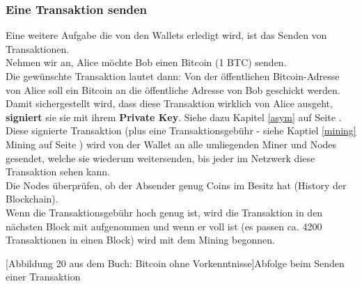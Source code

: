\documentclass[10pt,a4paper,titlepage]{paper}
\begin{document}
\subsubsection{Eine Transaktion senden}
Eine weitere Aufgabe die von den Wallets erledigt wird, ist das Senden von Transaktionen.\\
Nehmen wir an, Alice möchte Bob einen Bitcoin (1 BTC) senden.\\
Die gewünschte Transaktion lautet dann: Von der öffentlichen Bitcoin-Adresse von Alice soll ein Bitcoin an die öffentliche Adresse von Bob geschickt werden.\\
Damit sichergestellt wird, dass diese Transaktion wirklich von Alice ausgeht, \textbf{signiert} sie sie mit ihrem \textbf{Private Key}. Siehe dazu Kapitel \ref{asym} auf Seite \pageref{asym}.\\
Diese signierte Transaktion (plus eine Transaktionsgebühr - siehe Kaptiel \ref{mining} Mining auf Seite \pageref{mining}) wird von der Wallet an alle umliegenden Miner und Nodes gesendet, welche sie wiederum weitersenden, bis jeder im Netzwerk diese Transaktion sehen kann.\\
Die Nodes überprüfen, ob der Absender genug Coins im Besitz hat (History der Blockchain).\\
Wenn die Transaktionsgebühr hoch genug ist, wird die Transaktion in den nächsten Block mit aufgenommen und wenn er voll ist (es passen ca. 4200 Transaktionen in einen Block) wird mit dem Mining begonnen.
\begin{center}
[Abbildung 20 aus dem Buch: Bitcoin ohne Vorkenntnisse]{Abfolge beim Senden einer Transaktion}
\end{center}
\end{document}
